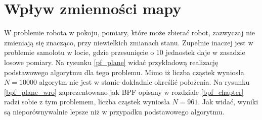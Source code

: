\section{Wpływ zmienności mapy} \label{zmienna_mapa_chap}
W problemie robota w pokoju, pomiary, które może zbierać robot, zazwyczaj nie zmieniają się znacząco, przy niewielkich zmianach stanu. Zupełnie inaczej jest w problemie samolotu w locie, gdzie przesunięcie o 10 jednostek daje w zasadzie losowe pomiary. Na rysunku \ref{pf_plane} widać przykładową realizację podstawowego algorytmu dla tego problemu. Mimo iż liczba cząstek wyniosła $N=10000$ algorytm nie jest w stanie dokładnie określić położenia. Na rysunku \ref{bpf_plane_wro} zaprezentowano jak BPF opisany w rozdziale \ref{bpf_chapter} radzi sobie z tym problemem, liczba cząstek wyniosła $N=961$. Jak widać, wyniki są nieporównywalnie lepsze niż w przypadku podstawowego algorytmu.
